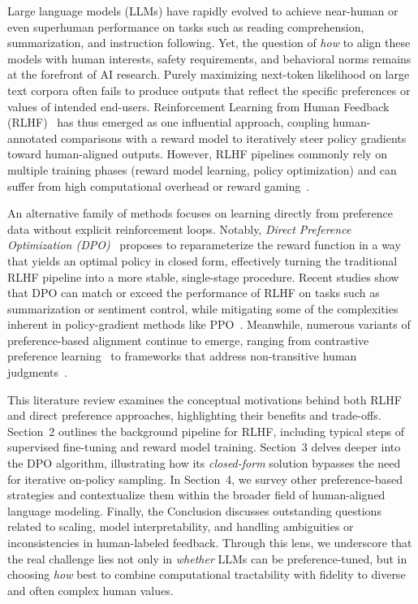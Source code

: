 \documentclass[a4paper,oneside,10pt,ngerman,english]{scrartcl}
\begin{document}
Large language models (LLMs) have rapidly evolved to achieve near-human or even superhuman
performance on tasks such as reading comprehension, summarization, and instruction following. Yet,
the question of \emph{how} to align these models with human interests, safety requirements, and
behavioral norms remains at the forefront of AI research. Purely maximizing next-token likelihood
on large text corpora often fails to produce outputs that reflect the specific preferences or values
of intended end-users. Reinforcement Learning from Human Feedback (RLHF)~\cite{bib:Christiano2017}
has thus emerged as one influential approach, coupling human-annotated comparisons with a reward
model to iteratively steer policy gradients toward human-aligned outputs. However, RLHF pipelines
commonly rely on multiple training phases (reward model learning, policy optimization) and can
suffer from high computational overhead or reward gaming~\cite{bib:Gao2023}.

An alternative family of methods focuses on learning directly from preference data without explicit
reinforcement loops. Notably, \emph{Direct Preference Optimization (DPO)}~\cite{bib:Rafailov2023}
proposes to reparameterize the reward function in a way that yields an optimal policy in closed form,
effectively turning the traditional RLHF pipeline into a more stable, single-stage procedure. Recent
studies show that DPO can match or exceed the performance of RLHF on tasks such as summarization
or sentiment control, while mitigating some of the complexities inherent in policy-gradient methods
like PPO~\cite{bib:Schulman2017}. Meanwhile, numerous variants of preference-based alignment
continue to emerge, ranging from contrastive preference learning~\cite{bib:Zhao2023} to frameworks
that address non-transitive human judgments~\cite{bib:Tversky1969}.

This literature review examines the conceptual motivations behind both RLHF and direct preference
approaches, highlighting their benefits and trade-offs. Section~2 outlines the background pipeline
for RLHF, including typical steps of supervised fine-tuning and reward model training. Section~3
delves deeper into the DPO algorithm, illustrating how its \emph{closed-form} solution bypasses the
need for iterative on-policy sampling. In Section~4, we survey other preference-based strategies and
contextualize them within the broader field of human-aligned language modeling. Finally, the
Conclusion discusses outstanding questions related to scaling, model interpretability, and handling
ambiguities or inconsistencies in human-labeled feedback. Through this lens, we underscore that the
real challenge lies not only in \emph{whether} LLMs can be preference-tuned, but in choosing \emph{how}
best to combine computational tractability with fidelity to diverse and often complex human values.
\end{document}
